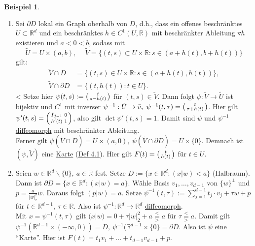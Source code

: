 \documentclass[a4paper]{report}
\newcommand{\R}{\mathbb{R}}
\newcommand{\overunderset}[3]{\overset{#1}{\underset{#3}{#2}}}
\newenvironment{jsmallmatrix}{\left( \begin{smallmatrix}}{\end{smallmatrix} \right)}
\newcommand{\jhyperref}[2]{\hyperref[j_#1]{#2}}
\newcommand{\jlink}[1]{\jhyperref{#1}{#1}}
\newcommand{\jabb}[3]{ #1: #2 \rightarrow #3 }
\theoremstyle{plain}
\theoremstyle{definition}
\newtheorem{expl}[thm]{Beispiel}
\begin{document}
{{{{\begin{expl}
\begin{enumerate}
        
        \item Sei $\partial D$ lokal ein Graph oberhalb von $D$, d.h., dass ein offenes beschränktes $U\subset \R^d$ und ein beschränktes $h\in C^1(U,\R)$ mit beschränkter Ableitung $\triangledown h$ existieren und $a < 0 < b$, sodass mit
        \[
            \tilde{U} = U \times (a,b), \hspace{15pt} \tilde{V} = \{(t,s) \subset U \times \R : s \in (a+h(t), b+h(t))\}
        \]
        gilt:
        \[
            \begin{split}
                \tilde{V} \cap D &= \{(t,s) \in U \times \R : s\in (a+h(t), h(t))\},\\
                \tilde{V} \cap \partial D &= \{(t,h(t)) : t \in U\}.
            \end{split}
        \]<
        Setze hier $\psi(t,s) := \begin{jsmallmatrix} t \\ s - h(t) \end{jsmallmatrix}$ für $(t,s) \in \tilde{V}$. Dann folgt $\jabb{\psi}{\tilde{V}}{\tilde{U}}$ ist bijektiv und $C^1$ mit inverser $\jabb{\psi^{-1}}{\tilde{U}}{\tilde{v}},\ \psi^{-1}(t,\tau) = \begin{jsmallmatrix} t \\ \tau + h(t) \end{jsmallmatrix}$. Hier gilt $\psi'(t,s) = \begin{jsmallmatrix}I_{d-1} & 0 \\ h'(t) & 1\end{jsmallmatrix}$, also gilt $\det \psi'(t,s)=1$. Damit sind $\psi$ und $\psi^{-1}$ \jlink{diffeomorph} mit beschränkter Ableitung.\\
        Ferner gilt $\psi(\tilde{V}\cap D) = U \times (a,0),\ \psi(\tilde{V} \cap \partial D) = U \times \{0\}$. Demnach ist $(\psi, \tilde{V})$ eine \jlink{Karte} (\jlink{Def 4.1}). Hier gilt $F(t) = \begin{jsmallmatrix}t \\ h(t)\end{jsmallmatrix}$ für $t\in U$.
        
        \item Seien $w \in \R^d\backslash \{0\},\ a\in \R$ fest. Setze $D := \{x \in \R^d: (x|w) < a\}$ (Halbraum). Dann ist $\partial D = \{x \in \R^d : (x|w) = a\}$. Wähle Basis $v_1,\dots, v_{d-1}$ von $\{w\}^\bot$ und $p = \frac{a}{|w|_2^2}w$. Daraus folgt $(p|w) = a$. Setze $\psi^{-1}(t,\tau) := \sum_{j=1}^{d-1} t_j\cdot v_j + \tau w + p$ für $t \in \R^{d-1},\ \tau \in \R$. Also ist $\jabb{\psi^{-1}}{\R^d}{\R^d}$ \jlink{diffeomorph}.\\
        Mit $x = \psi^{-1}(t,\tau)$ gilt $(x|w) = 0 + \tau |w|_2^2 + a \overunderset{<}{=}{>} a$ für $\tau \overunderset{<}{=}{>} a$. Damit gilt $\psi^{-1}(\R^{d-1} \times (-\infty,0)) = D, \ \psi^{-1}(\R^{d-1} \times \{0\}= \partial D$. Also ist $\psi$ eine ``Karte''. Hier ist $F(t) = t_1 v_1 + \dots + t_{d-1} v_{d-1} + p$.
    \end{enumerate}
\end{expl}

}}}}
\end{document}
